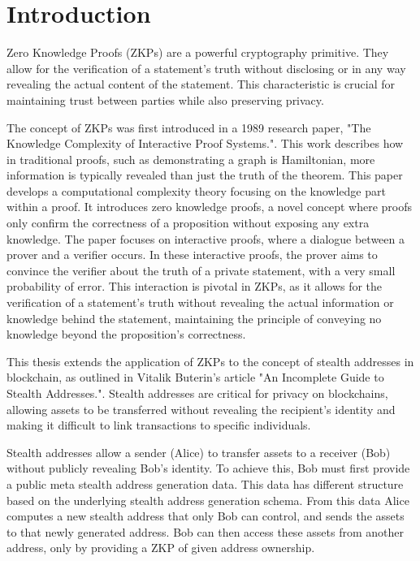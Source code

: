 \chapter{Introduction}

Zero Knowledge Proofs (ZKPs) are a powerful cryptography primitive. They allow
for the verification of a statement's truth without disclosing or in any way revealing
the actual content of the statement. This characteristic is crucial for
maintaining trust between parties while also preserving privacy.

The concept of ZKPs was first introduced in a 1989 research paper, "The
Knowledge Complexity of Interactive Proof Systems."\cite{Goldwasser1989}.
This work describes how in traditional proofs, such as demonstrating a graph
is Hamiltonian, more information is typically revealed than just the truth of
the theorem. This paper develops a computational complexity theory focusing
on the knowledge part within a proof. It introduces zero knowledge proofs,
a novel concept where proofs only confirm the correctness of a proposition
without exposing any extra knowledge. The paper focuses on interactive
proofs, where a dialogue between a prover and a verifier occurs. In these
interactive proofs, the prover aims to convince the verifier about the truth
of a private statement, with a very small probability of error. This
interaction is pivotal in ZKPs, as it allows for the verification of a
statement's truth without revealing the actual information or knowledge
behind the statement, maintaining the principle of conveying no
knowledge beyond the proposition's correctness.

This thesis extends the application of ZKPs to the concept of stealth
addresses in blockchain, as outlined in Vitalik Buterin's article "An
Incomplete Guide to Stealth Addresses."\cite{ButerinIncompleteGuide}.
Stealth addresses are critical for privacy on blockchains, allowing assets to
be transferred without revealing the recipient's identity and making
it difficult to link transactions to specific individuals.

Stealth addresses allow a sender (Alice) to transfer assets to a receiver (Bob) without
publicly revealing Bob's identity. To achieve this, Bob
must first provide a public meta stealth address generation data. This data
has different structure based on the underlying stealth address generation
schema. From this data Alice computes a new stealth address that only Bob can
control, and sends the assets to that newly generated address. Bob can then
access these assets from another address, only by providing a ZKP of given
address ownership.

